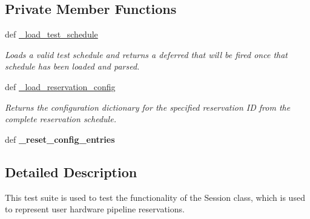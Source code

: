 \subsection*{Private Member Functions}
\begin{DoxyCompactItemize}
\item 
def \hyperlink{classhwm_1_1sessions_1_1tests_1_1test__session_1_1_test_session_a1dbb72634c88c0000ceb8de2672649d3}{\-\_\-load\-\_\-test\-\_\-schedule}
\begin{DoxyCompactList}\small\item\em Loads a valid test schedule and returns a deferred that will be fired once that schedule has been loaded and parsed. \end{DoxyCompactList}\item 
def \hyperlink{classhwm_1_1sessions_1_1tests_1_1test__session_1_1_test_session_a89aa4b0361af66195b3e02df29760700}{\-\_\-load\-\_\-reservation\-\_\-config}
\begin{DoxyCompactList}\small\item\em Returns the configuration dictionary for the specified reservation I\-D from the complete reservation schedule. \end{DoxyCompactList}\item 
\hypertarget{classhwm_1_1sessions_1_1tests_1_1test__session_1_1_test_session_a40f0110c38033eb73371862cf29d932c}{def {\bfseries \-\_\-reset\-\_\-config\-\_\-entries}}\label{classhwm_1_1sessions_1_1tests_1_1test__session_1_1_test_session_a40f0110c38033eb73371862cf29d932c}

\end{DoxyCompactItemize}


\subsection{Detailed Description}
This test suite is used to test the functionality of the Session class, which is used to represent user hardware pipeline reservations. 

